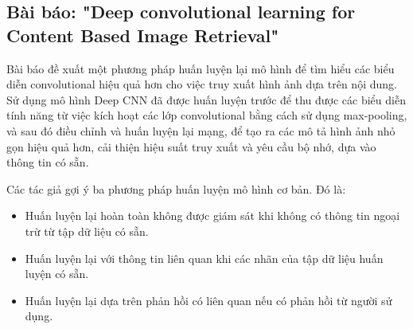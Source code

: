 \documentclass[a4paper,14pt]{extreport}
\begin{document}

\subsection{Bài báo: "Deep convolutional learning for Content Based Image Retrieval" \cite{paper-4}}

Bài báo đề xuất một phương pháp huấn luyện lại mô hình để tìm hiểu các biểu diễn convolutional hiệu quả hơn cho việc truy xuất hình ảnh dựa trên nội dung. Sử dụng mô hình Deep CNN đã được huấn luyện trước để thu được các biểu diễn tính năng từ việc kích hoạt các lớp convolutional bằng cách sử dụng max-pooling, và sau đó điều chỉnh và huấn luyện lại mạng, để tạo ra các mô tả hình ảnh nhỏ gọn hiệu quả hơn, cải thiện hiệu suất truy xuất và yêu cầu bộ nhớ, dựa vào thông tin có sẵn. 

Các tác giả gợi ý ba phương pháp huấn luyện mô hình cơ bản. 
Đó là:
\begin{itemize}
        \item Huấn luyện lại hoàn toàn không được giám sát khi không có thông tin ngoại trừ từ tập dữ liệu có sẵn. 
        \item Huấn luyện lại với thông tin liên quan khi các nhãn của tập dữ liệu huấn luyện có sẵn.
        \item Huấn luyện lại dựa trên phản hồi có liên quan nếu có phản hồi từ người sử dụng. 
\end{itemize}
\end{document}
